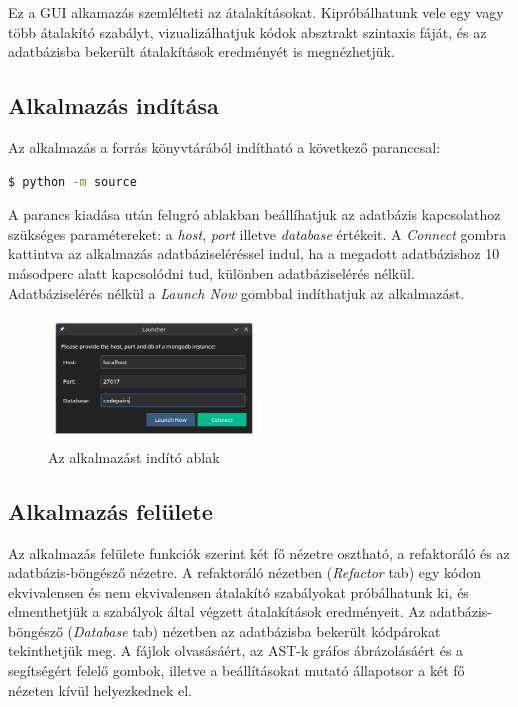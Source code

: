 Ez a GUI alkamazás szemlélteti az átalakításokat.
Kipróbálhatunk vele egy vagy több átalakító szabályt, vizualizálhatjuk kódok absztrakt szintaxis fáját,
és az adatbázisba bekerült átalakítások eredményét is megnézhetjük.

\subsection{Alkalmazás indítása}

Az alkalmazás a forrás könyvtárából indítható a következő paranccsal:

\begin{lstlisting}[language=bash]
	$ python -m source
\end{lstlisting}

A parancs kiadása után felugró ablakban beállíhatjuk az adatbázis kapcsolathoz szükséges paramétereket:
a \emph{host}, \emph{port} illetve \emph{database} értékeit.
A \emph{Connect} gombra kattintva az alkalmazás adatbáziseléréssel indul,
ha a megadott adatbázishoz 10 másodperc alatt kapcsolódni tud, különben adatbáziselérés nélkül.
Adatbáziselérés nélkül a \emph{Launch Now} gombbal indíthatjuk az alkalmazást.

\begin{figure}[H]
	\centering
	\includegraphics[width=0.5\textwidth]{images/screenshots/launcher.png}
	\caption{Az alkalmazást indító ablak}
\end{figure}

\subsection{Alkalmazás felülete}

Az alkalmazás felülete funkciók szerint két fő nézetre osztható, a refaktoráló és az adatbázis-böngésző nézetre.
A refaktoráló nézetben (\emph{Refactor} tab) egy kódon
ekvivalensen és nem ekvivalensen átalakító szabályokat próbálhatunk ki, és elmenthetjük
a szabályok által végzett átalakítások eredményeit.
Az adatbázis-böngésző (\emph{Database} tab) nézetben az adatbázisba bekerült kódpárokat tekinthetjük meg.
A fájlok olvasásáért, az AST-k gráfos ábrázolásáért és a segítségért felelő gombok, illetve a 
beállításokat mutató állapotsor a két fő nézeten kívül helyezkednek el.

